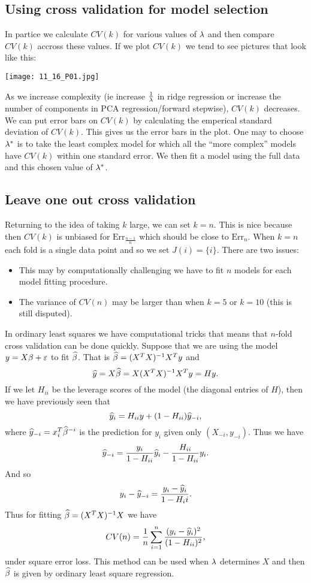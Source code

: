 \subsection{Using cross validation for model selection}
In partice we calculate $CV(k)$ for various values of $\lambda$ and then compare $CV(k)$ accross these values. If we plot $CV(k)$ we tend to see pictures that look like this:

\begin{center}
    \texttt{[image: 11\_16\_P01.jpg]}
\end{center}

As we increase complexity (ie increase $\frac{1}{\lambda}$ in ridge regression or increase the number of components in PCA regression/forward stepwise), $CV(k)$ decreases. We can put error bars on $CV(k)$ by calculating the emperical standard deviation of $CV(k)$. This gives us the error bars in the plot. One may to choose $\lambda^*$ is to take the least complex model for which all the ``more complex'' models have $CV(k)$ within one standard error. We then fit a model using the full data and this chosen value of $\lambda^*$. 

\subsection{Leave one out cross validation}
Returning to the idea of taking $k$ large, we can set $k=n$. This is nice because then $CV(k)$ is unbiased for $\text{Err}_{\frac{n-1}{n}}$ which should be close to $\text{Err}_{n}$. When $k=n$ each fold is a single data point and so we set $J(i)=\{i\}$. There are two issues:
\begin{itemize}
    \item This may by computationally challenging we have to fit $n$ models for each model fitting procedure.
    \item The variance of $CV(n)$ may be larger than when $k=5$ or $k=10$ (this is still disputed).
\end{itemize}
In ordinary least squares we have computational tricks that means that $n$-fold cross validation can be done quickly. Suppose that we are using the model $y=X\beta+\varepsilon$ to fit $\widehat{\beta}$. That is $\widehat{\beta}=(X^TX)^{-1}X^Ty$ and \[\widehat{y}=X\widehat{\beta}=X(X^TX)^{-1}X^Ty=Hy.\]
If we let $H_{ii}$ be the leverage scores of the model (the diagonal entries of $H$), then we have previously seen that 
\[\widehat{y}_i = H_{ii}y+(1-H_{ii})\widehat{y}_{- i}, \]
where $\widehat{y}_{- i} = x_i^T\widehat{\beta}^{- i}$ is the prediction for $y_i$ given only $(X_{- i}, y_{- i})$. Thus we have 
\[\widehat{y}_{- i} = \frac{y_i}{1-H_{ii}}\widehat{y}_i - \frac{H_{ii}}{1-H_{ii}}y_i. \]
And so
\[y_i - \widehat{y}_{- i} = \frac{y_i-\widehat{y}_i}{1-H_ii}. \]
Thus for fitting $\widehat{\beta} = (X^TX)^{-1}X$ we have
\[CV(n) = \frac{1}{n}\sum_{i=1}^n \frac{(y_i-\widehat{y}_i)^2}{(1-H_{ii})^2}, \]
under square error loss. This method can be used when $\lambda$ determines $X$ and then $\widehat{\beta}$ is given by ordinary least square regression.


